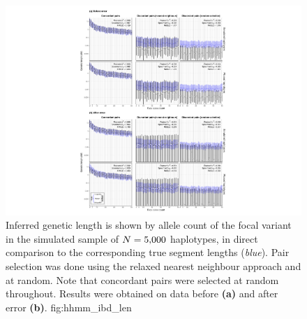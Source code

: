 

\begin{figure}[!htb]
\includegraphics[width=\textwidth]{./img/ch5/hhmm_ibd_len}
{Inferred genetic length is shown by allele count of the focal variant in the simulated sample of ${N=\n{5000}}$ haplotypes, in direct comparison to the corresponding true segment lengths (\emph{blue}).
Pair selection was done using the relaxed nearest neighbour approach and at random.
Note that concordant pairs were selected at random throughout.
Results were obtained on data before \textbf{(a)} and after error \textbf{(b)}.}
{fig:hhmm_ibd_len}
\end{figure}
